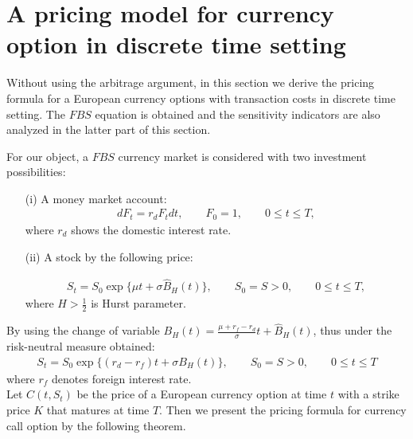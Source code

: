 \documentclass[a4paper,11pt]{amsart}
\numberwithin{equation}{section}
\theoremstyle{definition}
\theoremstyle{plain}
\theoremstyle{definition}
\newcommand{\1}{\mathbf{1}}
\begin{document}
\section{A pricing model for currency option in discrete time setting}\label{sec:3}
Without using the arbitrage argument, in this section we derive the pricing formula for a European currency options with transaction costs in discrete time setting. The $FBS$
equation is obtained and the sensitivity indicators are also analyzed in the latter part of this section.

For our object, a $FBS$ currency market is considered with two investment possibilities:


\begin{enumerate}
\item[(i)] A money market account:
\begin{eqnarray}
dF_t=r_dF_tdt,\qquad F_0=1,\qquad 0\leq t\leq T,
\label{eq:3}
\end{eqnarray}
where $r_d$ shows the domestic interest rate.

\item[(ii)] A stock by the following price:

\begin{eqnarray}
S_t=S_0\exp\{\mu t+\sigma \widehat{B}_H(t)\},\qquad S_0=S>0,\qquad 0\leq t\leq T,
\label{eq:4}
\end{eqnarray}
where $H>\frac{1}{2}$ is Hurst parameter.
\end{enumerate}

By using the change of variable  $B_H(t)=\frac{\mu+r_f-r_d}{\sigma}t+\widehat{B}_H(t)$, thus under the risk-neutral measure obtained:
\begin{eqnarray}
S_t=S_0\exp\{(r_d-r_f) t+\sigma B_H(t)\},\qquad S_0=S>0,\qquad 0\leq t\leq T
\label{eq:5}
\end{eqnarray}
where $r_f$ denotes foreign interest rate.\\


Let $C(t, S_t )$ be the price of a European currency option at time $t$ with a strike price $K$ that matures at time $T$. Then we
present the pricing formula for currency call option by the following theorem.
\end{document}
